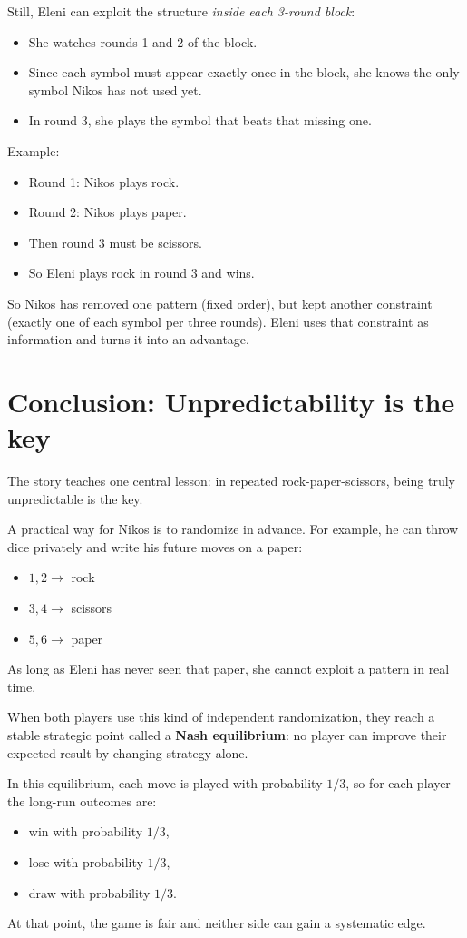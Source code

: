 Still, Eleni can exploit the structure \emph{inside each 3-round block}:
\begin{itemize}
  \item She watches rounds 1 and 2 of the block.
  \item Since each symbol must appear exactly once in the block, she knows the
  only symbol Nikos has not used yet.
  \item In round 3, she plays the symbol that beats that missing one.
\end{itemize}

Example:
\begin{itemize}
  \item Round 1: Nikos plays rock.
  \item Round 2: Nikos plays paper.
  \item Then round 3 must be scissors.
  \item So Eleni plays rock in round 3 and wins.
\end{itemize}

So Nikos has removed one pattern (fixed order), but kept another constraint
(exactly one of each symbol per three rounds). Eleni uses that constraint as
information and turns it into an advantage.

\section{Conclusion: Unpredictability is the key}
The story teaches one central lesson: in repeated rock-paper-scissors, being
truly unpredictable is the key.

A practical way for Nikos is to randomize in advance. For example, he can throw
dice privately and write his future moves on a paper:
\begin{itemize}
  \item \(1,2 \rightarrow\) rock
  \item \(3,4 \rightarrow\) scissors
  \item \(5,6 \rightarrow\) paper
\end{itemize}
As long as Eleni has never seen that paper, she cannot exploit a pattern in
real time.

When both players use this kind of independent randomization, they reach a
stable strategic point called a \textbf{Nash equilibrium}: no player can improve
their expected result by changing strategy alone.

In this equilibrium, each move is played with probability \(1/3\), so for each
player the long-run outcomes are:
\begin{itemize}
  \item win with probability \(1/3\),
  \item lose with probability \(1/3\),
  \item draw with probability \(1/3\).
\end{itemize}
At that point, the game is fair and neither side can gain a systematic edge.

